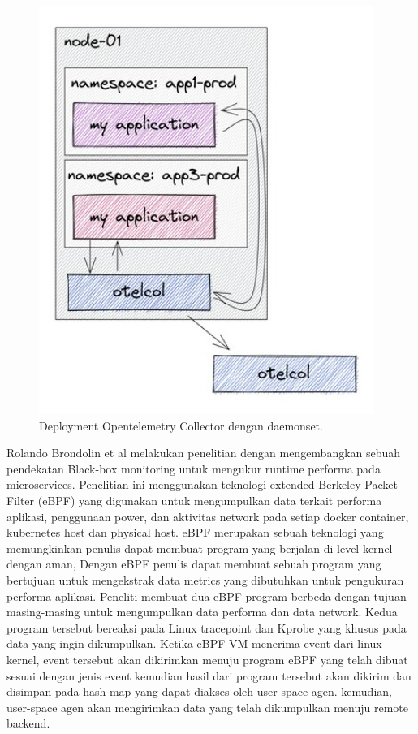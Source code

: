 \begin{enumerate}
  \begin{figure}[H]
    \centering
      \includegraphics[scale=0.8]{gambar/daemonset-pattern}
      \caption{Deployment Opentelemetry Collector dengan daemonset.}
      \label{otel-collector-daemonset}
  \end{figure}

  \end{enumerate}

  Rolando Brondolin et al melakukan penelitian dengan mengembangkan sebuah pendekatan Black-box monitoring untuk mengukur runtime performa pada microservices. Penelitian ini menggunakan teknologi extended Berkeley Packet Filter (eBPF) yang digunakan untuk mengumpulkan data terkait performa aplikasi, penggunaan power, dan aktivitas network pada setiap docker container, kubernetes host dan physical host. eBPF merupakan sebuah teknologi yang memungkinkan penulis dapat membuat program yang berjalan di level kernel dengan aman, Dengan eBPF penulis dapat membuat sebuah program yang bertujuan untuk mengekstrak data metrics yang dibutuhkan untuk pengukuran performa aplikasi. Peneliti membuat dua eBPF program berbeda dengan tujuan masing-masing untuk mengumpulkan data performa dan data network. Kedua program tersebut bereaksi pada Linux tracepoint dan Kprobe yang khusus pada data yang ingin dikumpulkan. Ketika eBPF VM menerima event dari linux kernel, event tersebut akan dikirimkan menuju program eBPF yang telah dibuat sesuai dengan jenis event kemudian hasil dari program tersebut akan dikirim dan disimpan pada hash map yang dapat diakses oleh user-space agen. kemudian, user-space agen akan mengirimkan data yang telah dikumpulkan menuju remote backend.


